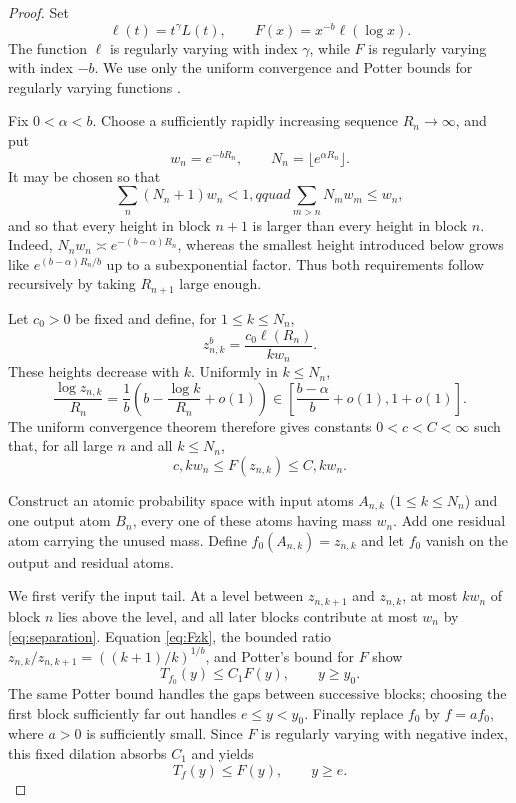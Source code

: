 \documentclass[11pt]{article}
\newcommand{\ellf}{\ell}
\newcommand{\Tp}[1]{T_{#1}}
\begin{document}
\begin{proof}
Set
\[
 \ellf(t)=t^\gamma L(t),\qquad
 F(x)=x^{-b}\ellf(\log x).
\]
The function \(\ellf\) is regularly varying with index \(\gamma\), while
\(F\) is regularly varying with index \(-b\).  We use only the uniform
convergence and Potter bounds for regularly varying functions
\cite[Theorems 1.2.1 and 1.5.6]{BGT}.

Fix \(0<\alpha<b\).  Choose a sufficiently rapidly increasing sequence
\(R_n\to\infty\), and put
\[
 w_n=e^{-bR_n},\qquad N_n=\lfloor e^{\alpha R_n}\rfloor.
\]
It may be chosen so that
\begin{equation}\label{eq:separation}
 \sum_n(N_n+1)w_n<1,qquad
 \sum_{m>n}N_mw_m\le w_n,
\end{equation}
and so that every height in block \(n+1\) is larger than every height in
block \(n\).  Indeed, \(N_nw_n\asymp e^{-(b-\alpha)R_n}\), whereas the
smallest height introduced below grows like
\(e^{(b-\alpha)R_n/b}\) up to a subexponential factor.  Thus both requirements
follow recursively by taking \(R_{n+1}\) large enough.

Let \(c_0>0\) be fixed and define, for \(1\le k\le N_n\),
\begin{equation}\label{eq:zdef}
 z_{n,k}^b=\frac{c_0\ellf(R_n)}{k w_n}.
\end{equation}
These heights decrease with \(k\).  Uniformly in \(k\le N_n\),
\[
 \frac{\log z_{n,k}}{R_n}
 =\frac1b\left(b-\frac{\log k}{R_n}+o(1)\right)
 \in \left[\frac{b-\alpha}{b}+o(1),1+o(1)\right].
\]
The uniform convergence theorem therefore gives constants \(0<c<C<\infty\)
such that, for all large \(n\) and all \(k\le N_n\),
\begin{equation}\label{eq:Fzk}
 c,k w_n\le F(z_{n,k})\le C,k w_n.
\end{equation}

Construct an atomic probability space with input atoms \(A_{n,k}\)
(\(1\le k\le N_n\)) and one output atom \(B_n\), every one of these atoms
having mass \(w_n\).  Add one residual atom carrying the unused mass.  Define
\(f_0(A_{n,k})=z_{n,k}\) and let \(f_0\) vanish on the output and residual
atoms.

We first verify the input tail.  At a level between \(z_{n,k+1}\) and
\(z_{n,k}\), at most \(k w_n\) of block \(n\) lies above the level, and all
later blocks contribute at most \(w_n\) by \eqref{eq:separation}.  Equation
\eqref{eq:Fzk}, the bounded ratio
\(z_{n,k}/z_{n,k+1}=((k+1)/k)^{1/b}\), and Potter's bound for \(F\) show
\[
 \Tp{f_0}(y)\le C_1F(y),\qquad y\ge y_0.
\]
The same Potter bound handles the gaps between successive blocks; choosing
the first block sufficiently far out handles \(e\le y<y_0\).  Finally replace
\(f_0\) by \(f=a f_0\), where \(a>0\) is sufficiently small.  Since \(F\) is
regularly varying with negative index, this fixed dilation absorbs \(C_1\)
and yields
\begin{equation}\label{eq:inputtail}
 \Tp f(y)\le F(y),\qquad y\ge e.
\end{equation}


\end{proof}
\end{document}

